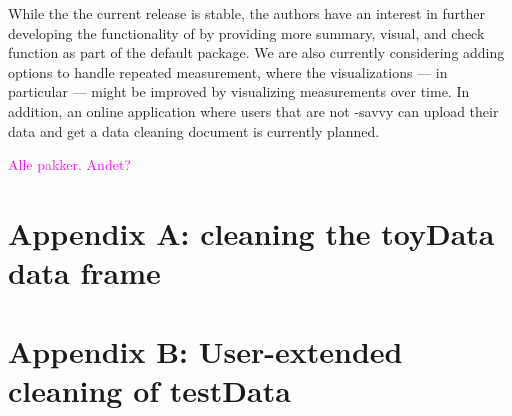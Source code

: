 \documentclass[article,shortnames]{jss}
\newcommand{\hl}[1]{\textcolor{magenta}{#1}}
\begin{document}
While the the current release is stable, the authors have an interest
in further developing the functionality of  by providing
more summary, visual, and check function as part of the default
package. We are also currently considering adding options to handle
repeated measurement, where the visualizations --- in particular ---
might be improved by visualizing measurements over time. In addition,
an online  application where users that are not
-savvy can upload their data and get a data cleaning
document is currently planned.



\nocite{R}
\nocite{shiny}
\nocite{cleanR}
\nocite{rmarkdown}
\nocite{ggplot2}
\nocite{plyr}
\nocite{data.table}
\nocite{validate}
\nocite{editrules}
\nocite{janitor}
\nocite{DataCombine}
\nocite{txtplot}

% 


\hl{Alle pakker. Andet?}


\appendix

\section{Appendix A: cleaning the toyData data frame} \label{sec:appendix1}


\section{Appendix B: User-extended cleaning of  testData} \label{sec:appendix2}

\end{document}

